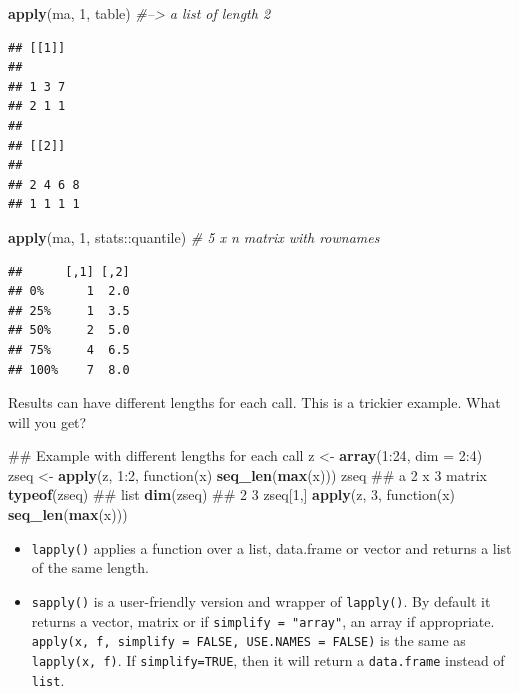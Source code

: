 \documentclass[]{book}
\newenvironment{Shaded}{\begin{snugshade}}{\end{snugshade}}
\newcommand{\KeywordTok}[1]{\textcolor[rgb]{0.13,0.29,0.53}{\textbf{{#1}}}}
\newcommand{\DataTypeTok}[1]{\textcolor[rgb]{0.13,0.29,0.53}{{#1}}}
\newcommand{\DecValTok}[1]{\textcolor[rgb]{0.00,0.00,0.81}{{#1}}}
\newcommand{\StringTok}[1]{\textcolor[rgb]{0.31,0.60,0.02}{{#1}}}
\newcommand{\CommentTok}[1]{\textcolor[rgb]{0.56,0.35,0.01}{\textit{{#1}}}}
\newcommand{\NormalTok}[1]{{#1}}
\providecommand{\tightlist}{%
  \setlength{\itemsep}{0pt}\setlength{\parskip}{0pt}}
\theoremstyle{definition}
\theoremstyle{definition}
\theoremstyle{remark}
\begin{document}
\begin{Shaded}
\begin{Highlighting}[]
\KeywordTok{apply}\NormalTok{(ma, }\DecValTok{1}\NormalTok{, table)  }\CommentTok{#--> a list of length 2}
\end{Highlighting}
\end{Shaded}

\begin{verbatim}
## [[1]]
## 
## 1 3 7 
## 2 1 1 
## 
## [[2]]
## 
## 2 4 6 8 
## 1 1 1 1
\end{verbatim}

\begin{Shaded}
\begin{Highlighting}[]
\KeywordTok{apply}\NormalTok{(ma, }\DecValTok{1}\NormalTok{, stats::quantile) }\CommentTok{# 5 x n matrix with rownames}
\end{Highlighting}
\end{Shaded}

\begin{verbatim}
##      [,1] [,2]
## 0%      1  2.0
## 25%     1  3.5
## 50%     2  5.0
## 75%     4  6.5
## 100%    7  8.0
\end{verbatim}

Results can have different lengths for each call. This is a trickier
example. What will you get?

\begin{Shaded}
\begin{Highlighting}[]
\NormalTok{## Example with different lengths for each call}
\NormalTok{z <-}\StringTok{ }\KeywordTok{array}\NormalTok{(}\DecValTok{1}\NormalTok{:}\DecValTok{24}\NormalTok{, }\DataTypeTok{dim =} \DecValTok{2}\NormalTok{:}\DecValTok{4}\NormalTok{)}
\NormalTok{zseq <-}\StringTok{ }\KeywordTok{apply}\NormalTok{(z, }\DecValTok{1}\NormalTok{:}\DecValTok{2}\NormalTok{, function(x) }\KeywordTok{seq_len}\NormalTok{(}\KeywordTok{max}\NormalTok{(x)))}
\NormalTok{zseq         ## a 2 x 3 matrix}
\KeywordTok{typeof}\NormalTok{(zseq) ## list}
\KeywordTok{dim}\NormalTok{(zseq) ## 2 3}
\NormalTok{zseq[}\DecValTok{1}\NormalTok{,]}
\KeywordTok{apply}\NormalTok{(z, }\DecValTok{3}\NormalTok{, function(x) }\KeywordTok{seq_len}\NormalTok{(}\KeywordTok{max}\NormalTok{(x)))}
\end{Highlighting}
\end{Shaded}

\begin{itemize}
\tightlist
\item
  \texttt{lapply()} applies a function over a list, data.frame or vector
  and returns a list of the same length.
\item
  \texttt{sapply()} is a user-friendly version and wrapper of
  \texttt{lapply()}. By default it returns a vector, matrix or if
  \texttt{simplify\ =\ "array"}, an array if appropriate.
  \texttt{apply(x,\ f,\ simplify\ =\ FALSE,\ USE.NAMES\ =\ FALSE)} is
  the same as \texttt{lapply(x,\ f)}. If \texttt{simplify=TRUE}, then it
  will return a \texttt{data.frame} instead of \texttt{list}.
\end{itemize}
\end{document}
